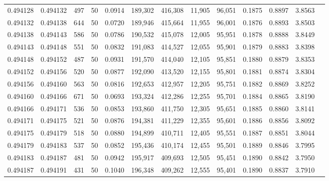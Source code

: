 \begin{tabular}{rrrrrrrrrrrrr}
0.494128 & 0.494132 &   497 &  50 &                                     0.0914 & 189,302 & 416,308 &  11,905 &  96,051 & 0.1875 & 0.8897 & 3.8563 \\
0.494132 & 0.494138 &   644 &  50 &                                     0.0720 & 189,946 & 415,664 &  11,955 &  96,001 & 0.1876 & 0.8893 & 3.8503 \\
0.494138 & 0.494143 &   586 &  50 &                                     0.0786 & 190,532 & 415,078 &  12,005 &  95,951 & 0.1878 & 0.8888 & 3.8449 \\
0.494143 & 0.494148 &   551 &  50 &                                     0.0832 & 191,083 & 414,527 &  12,055 &  95,901 & 0.1879 & 0.8883 & 3.8398 \\
0.494148 & 0.494152 &   487 &  50 &                                     0.0931 & 191,570 & 414,040 &  12,105 &  95,851 & 0.1880 & 0.8879 & 3.8353 \\
0.494152 & 0.494156 &   520 &  50 &                                     0.0877 & 192,090 & 413,520 &  12,155 &  95,801 & 0.1881 & 0.8874 & 3.8304 \\
0.494156 & 0.494160 &   563 &  50 &                                     0.0816 & 192,653 & 412,957 &  12,205 &  95,751 & 0.1882 & 0.8869 & 3.8252 \\
0.494160 & 0.494166 &   671 &  50 &                                     0.0693 & 193,324 & 412,286 &  12,255 &  95,701 & 0.1884 & 0.8865 & 3.8190 \\
0.494166 & 0.494171 &   536 &  50 &                                     0.0853 & 193,860 & 411,750 &  12,305 &  95,651 & 0.1885 & 0.8860 & 3.8141 \\
0.494171 & 0.494175 &   521 &  50 &                                     0.0876 & 194,381 & 411,229 &  12,355 &  95,601 & 0.1886 & 0.8856 & 3.8092 \\
0.494175 & 0.494179 &   518 &  50 &                                     0.0880 & 194,899 & 410,711 &  12,405 &  95,551 & 0.1887 & 0.8851 & 3.8044 \\
0.494179 & 0.494183 &   537 &  50 &                                     0.0852 & 195,436 & 410,174 &  12,455 &  95,501 & 0.1889 & 0.8846 & 3.7995 \\
0.494183 & 0.494187 &   481 &  50 &                                     0.0942 & 195,917 & 409,693 &  12,505 &  95,451 & 0.1890 & 0.8842 & 3.7950 \\
0.494187 & 0.494191 &   431 &  50 &                                     0.1040 & 196,348 & 409,262 &  12,555 &  95,401 & 0.1890 & 0.8837 & 3.7910 \\

\end{tabular}
